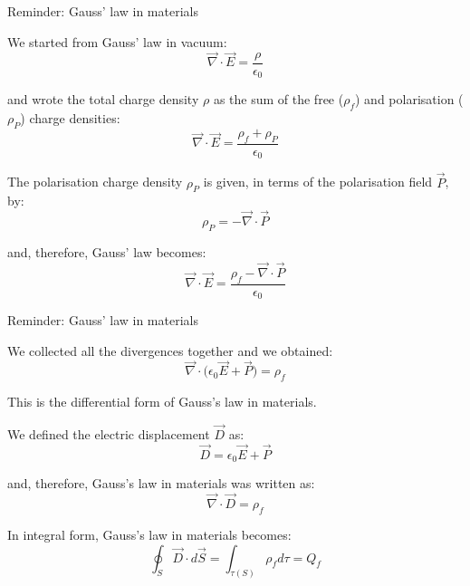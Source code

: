 {
\reminderslide

%
%
%

\begin{frame}{Reminder: Gauss' law in materials}

We started from Gauss’ law in vacuum:
\begin{equation*}
  \vec{\nabla} \cdot \vec{E} = \frac{\rho}{\epsilon_0}
\end{equation*}

and wrote the total charge density $\rho$ as the sum of the free ($\rho_{f}$)
and polarisation ($\rho_{P}$) charge densities:
\begin{equation*}
  \vec{\nabla} \cdot \vec{E} = \frac{\rho_{f} + \rho_{P}}{\epsilon_0}
\end{equation*}

The polarisation charge density $\rho_{P}$ is given, in terms of the polarisation field $\vec{P}$, by:
\begin{equation*}
  \rho_{P} = - \vec{\nabla}\cdot\vec{P}
\end{equation*}

and, therefore, Gauss' law becomes:
\begin{equation*}
  \vec{\nabla} \cdot \vec{E} = \frac{\rho_{f} - \vec{\nabla} \cdot \vec{P}}{\epsilon_0}
\end{equation*}

\end{frame}

%
%
%

\begin{frame}{Reminder: Gauss' law in materials}

We collected all the divergences together and we obtained:
\begin{equation*}
  \vec{\nabla} \cdot \Big( \epsilon_0 \vec{E} + \vec{P} \Big) = \rho_{f}
\end{equation*}

This is the differential form of Gauss's law in materials.\\
\vspace{0.2cm}

We defined the electric displacement $\vec{D}$ as:
\begin{equation*}
  \vec{D} = \epsilon_0 \vec{E} + \vec{P}
\end{equation*}

and, therefore, Gauss's law in materials was written as:
\begin{equation*}
  \vec{\nabla} \cdot \vec{D} = \rho_{f}
\end{equation*}

In integral form,  Gauss's law in materials becomes:
\begin{equation*}
  \oint_{S} \vec{D} \cdot d\vec{S} = \int_{\tau(S)} \rho_{f} d\tau = Q_{f}
\end{equation*}

\end{frame}

} %


